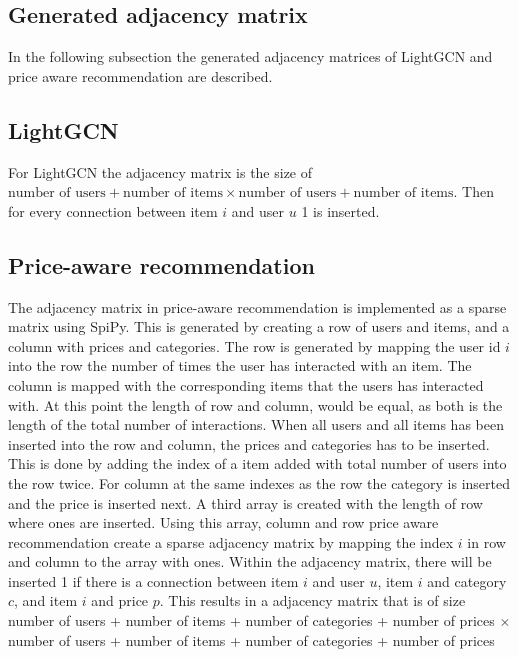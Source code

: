 \subsection{Generated adjacency matrix}
In the following subsection the generated adjacency matrices of LightGCN and price aware recommendation are described.

\subsection{LightGCN}
For LightGCN the adjacency matrix is the size of $\textrm{number of users} + \textrm{number of items} \times \textrm{number of users} + \textrm{number of items}$.
Then for every connection between item $i$ and user $u$ 1 is inserted.

\subsection{Price-aware recommendation}
The adjacency matrix in price-aware recommendation is implemented as a sparse matrix using SpiPy.
This is generated by creating a row of users and items, and a column with prices and categories.
The row is generated by mapping the user id $i$ into the row the number of times the user has interacted with an item.
The column is mapped with the corresponding items that the users has interacted with.
At this point the length of row and column, would be equal, as both is the length of the total number of interactions.
When all users and all items has been inserted into the row and column, the prices and categories has to be inserted.
This is done by adding the index of a item added with total number of users into the row twice.
For column at the same indexes as the row the category is inserted and the price is inserted next.
A third array is created with the length of row where ones are inserted.
Using this array, column and row price aware recommendation create a sparse adjacency matrix by mapping the index $i$ in row and column to the array with ones.
Within the adjacency matrix, there will be inserted 1 if there is a connection between item $i$ and user $u$, item $i$ and category $c$, and item $i$ and price $p$.
This results in a adjacency matrix that is of size number of users + number of items + number of categories + number of prices $\times$ number of users + number of items + number of categories + number of prices